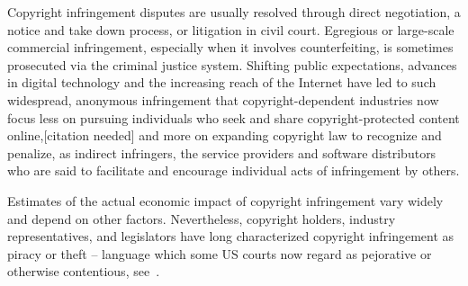 Copyright infringement disputes are usually resolved through direct negotiation, a notice and take down process, or
litigation in civil court.
Egregious or large-scale commercial infringement, especially when it involves counterfeiting, is sometimes prosecuted
via the criminal justice system.
Shifting public expectations, advances in digital technology and the increasing reach of the Internet have led to such
widespread, anonymous infringement that copyright-dependent industries now focus less on pursuing individuals who seek
and share copyright-protected content online,[citation needed] and more on expanding copyright law to recognize and
penalize, as indirect infringers, the service providers and software distributors who are said to facilitate and
encourage individual acts of infringement by others.

Estimates of the actual economic impact of copyright infringement vary widely and depend on other factors.
Nevertheless, copyright holders, industry representatives, and legislators have long characterized copyright
infringement as piracy or theft – language which some US courts now regard as pejorative or otherwise contentious,
see~\cite{powell1984dowling, li2009intellectual}.


